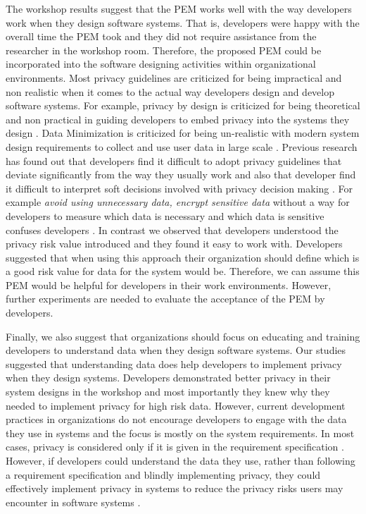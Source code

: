 \documentclass{sigchi}
\begin{document}
The workshop results suggest that the PEM works well with the way developers work when they design software systems. That is, developers were happy with the overall time the PEM took and they did not require assistance from the researcher in the workshop room. Therefore, the proposed PEM could be incorporated into the software designing activities within organizational environments. Most privacy guidelines are criticized for being impractical and non realistic when it comes to the actual way developers design and develop software systems. For example, privacy by design is criticized for being theoretical and non practical in guiding developers to embed privacy into the systems they design \cite {spiekermann2012challenges}. Data Minimization is criticized for being un-realistic with modern system design requirements to collect and use user data in large scale \cite {marr2015big}. Previous research has found out that developers find it difficult to adopt privacy guidelines that deviate significantly from the way they usually work and also that developer find it difficult to interpret soft decisions involved with privacy decision making \cite {ayalon2017developers}. For example \textit{avoid using unnecessary data, encrypt sensitive data} without a way for developers to measure which data is necessary and which data is sensitive confuses developers \cite {oetzel2014systematic}. In contrast we observed that developers understood the privacy risk value introduced and they found it easy to work with. Developers suggested that when using this approach their organization should define which is a good risk value for data for the system would be. Therefore, we can assume this PEM would be helpful for developers in their work environments. However, further experiments are needed to evaluate the acceptance of the PEM by developers.

Finally, we also suggest that organizations should focus on educating and training developers to understand data when they design software systems. Our studies suggested that understanding data does help developers to implement privacy when they design systems. Developers demonstrated better privacy in their system designs in the workshop and most importantly they knew why they needed to implement privacy for high risk data. However, current development practices in organizations do not encourage developers to engage with the data they use in systems and the focus is mostly on the system requirements. In most cases, privacy is considered only if it is given in the requirement specification \cite {hadar2017privacy, senarath2018why}. However, if developers could understand the data they use, rather than following a requirement specification and blindly implementing privacy, they could effectively implement privacy in systems to reduce the privacy risks users may encounter in software systems \cite {marr2015big, tene2012big}. 
\end{document}

